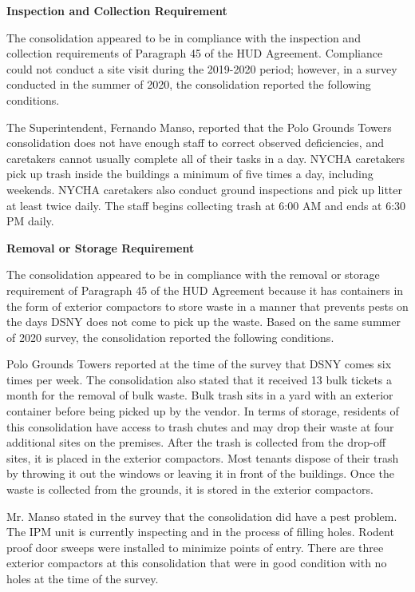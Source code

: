  

\textbf{Inspection and Collection Requirement} 

 

The consolidation appeared to be in compliance with the inspection and collection requirements of Paragraph 45 of the HUD Agreement. Compliance could not conduct a site visit during the 2019-2020 period; however, in a survey conducted in the summer of 2020, the consolidation reported the following conditions.

The Superintendent, Fernando Manso, reported that the Polo Grounds Towers consolidation does not have enough staff to correct observed deficiencies, and caretakers cannot usually complete all of their tasks in a day. NYCHA caretakers pick up trash inside the buildings a minimum of five times a day, including weekends. NYCHA caretakers also conduct ground inspections and pick up litter at least twice daily. The staff begins collecting trash at 6:00 AM and ends at 6:30 PM daily.

\textbf{Removal or Storage Requirement} 

The consolidation appeared to be in compliance with the removal or storage requirement of Paragraph  45 of the HUD Agreement because it has containers in the form of exterior compactors to store waste in a manner that prevents pests on the days DSNY does not come to pick up the waste. Based on the same summer of  2020  survey, the consolidation reported the following conditions.

  

Polo Grounds Towers reported at the time of the survey that DSNY comes six times per week. The consolidation also stated that it received 13 bulk tickets a month for the removal of bulk waste. Bulk trash sits in a yard with an exterior container before being picked up by the vendor. In terms of storage, residents of this consolidation have access to trash chutes and may drop their waste at four additional sites on the premises. After the trash is collected from the drop-off sites, it is placed in the exterior compactors.  Most tenants dispose of their trash by throwing it out the windows or leaving it in front of the buildings. Once the waste is collected from the grounds, it is stored in the exterior compactors.  

 

Mr. Manso stated in the survey that the consolidation did have a pest problem. The IPM unit is currently inspecting and in the process of filling holes. Rodent proof door sweeps were installed to minimize points of entry.  There are three exterior compactors at this consolidation that were in good condition with no holes at the time of the survey.

